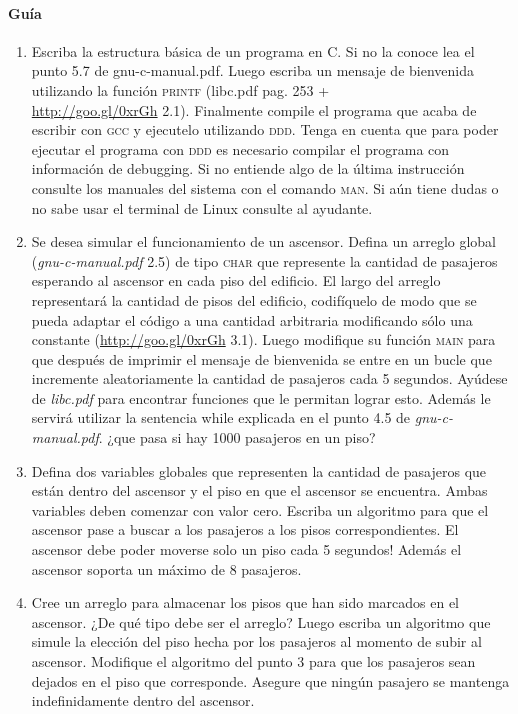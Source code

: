 \documentclass[letterpaper,10pt]{article}
\begin{document}
\newpage
\paragraph{Guía}
\begin{enumerate}
 \item Escriba la estructura básica de un programa en C. Si no la conoce lea el punto 5.7 de gnu-c-manual.pdf. Luego escriba un mensaje de
 bienvenida utilizando la función \textsc{printf} (libc.pdf pag. 253 +\\ \href{http://goo.gl/0xrGh}{http://goo.gl/0xrGh} 2.1).
 Finalmente compile el programa que acaba de escribir
 con \textsc{gcc} y ejecutelo utilizando \textsc{ddd}. Tenga en cuenta que para poder ejecutar el programa con \textsc{ddd} es necesario
 compilar el programa con información de debugging. Si no entiende algo de la última instrucción consulte los manuales del sistema con el
 comando \textsc{man}. Si aún tiene dudas o no sabe usar el terminal de Linux consulte al ayudante.

 \item Se desea simular el funcionamiento de un ascensor. Defina un arreglo global (\textit{gnu-c-manual.pdf} 2.5) de tipo \textsc{char} que represente la
 cantidad de pasajeros esperando al ascensor en cada piso del edificio. El largo del arreglo representará la cantidad de pisos del edificio,
 codifíquelo de modo que se pueda adaptar el código a una cantidad arbitraria modificando sólo una constante (\href{http://goo.gl/0xrGh}{http://goo.gl/0xrGh} 3.1). Luego
 modifique su función \textsc{main} para que después de imprimir el mensaje de bienvenida se entre en un bucle que incremente aleatoriamente la cantidad
 de pasajeros cada 5 segundos. Ayúdese de \textit{libc.pdf} para encontrar funciones que le permitan lograr esto. Además le servirá utilizar la sentencia
 while explicada en el punto 4.5 de \textit{gnu-c-manual.pdf}. ¿que pasa si hay 1000 pasajeros en un piso?

 \item Defina dos variables globales que representen la cantidad de pasajeros que están dentro del ascensor y el piso en que el ascensor se encuentra.
 Ambas variables deben comenzar con valor cero. Escriba un algoritmo para que el ascensor pase a buscar a los pasajeros a los pisos correspondientes.
 El ascensor debe poder moverse solo un piso cada 5 segundos! Además el ascensor soporta un máximo de 8 pasajeros.

 \item Cree un arreglo para almacenar los pisos que han sido marcados en el ascensor. ¿De qué tipo debe ser el arreglo? Luego escriba un algoritmo
 que simule la elección del piso hecha por los pasajeros al momento de subir al ascensor. Modifique el algoritmo del punto 3 para que los pasajeros
 sean dejados en el piso que corresponde. Asegure que ningún pasajero se mantenga indefinidamente dentro del ascensor.


\end{enumerate}
\end{document}
